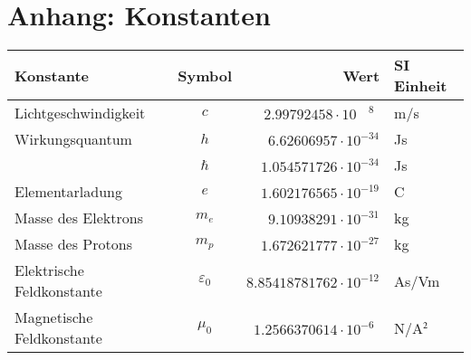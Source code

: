 \chapter{Anhang: Konstanten\label{chapter:konstanten}}
\rhead{}
\begin{center}
\begin{tabular}{lcrl}
\hline
Konstante&Symbol&Wert&SI Einheit\\
\hline
Lichtgeschwindigkeit     &$c$            &$2.99792458\cdot 10^{\phantom{-}8\phantom{0}}$&m/s\\
Wirkungsquantum          &$h$            &$6.62606957\cdot 10^{-34}$   &Js\\
                         &$\hbar$        &$1.054571726\cdot 10^{-34}$  &Js\\
Elementarladung          &$e$            &$1.602176565\cdot 10^{-19}$  &C \\
Masse des Elektrons      &$m_e$          &$9.10938291\cdot 10^{-31}$   &kg\\
Masse des Protons        &$m_p$          &$1.672621777\cdot 10^{-27}$  &kg\\
Elektrische Feldkonstante&$\varepsilon_0$&$8.85418781762\cdot 10^{-12}$&As/Vm\\
Magnetische Feldkonstante&$\mu_0$        &$1.2566370614\cdot 10^{-6\phantom{0}}$  &N/A$\mathstrut^2$\\
\hline
\end{tabular}
\end{center}

